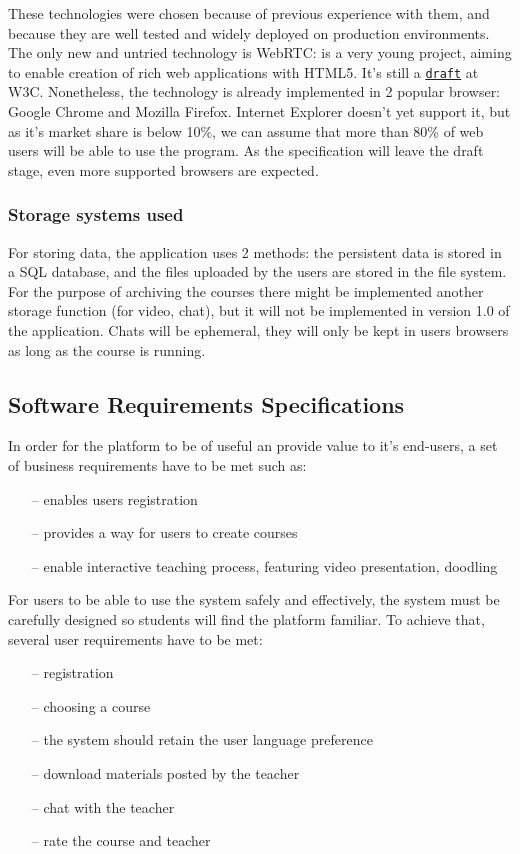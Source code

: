 These technologies were chosen because of previous experience with them, and because they
are well tested and widely deployed on production environments.
The only new and untried technology is WebRTC: is a very young project, aiming
to enable creation of rich web applications with HTML5. It's still a
\href{http://dev.w3.org/2011/webrtc/editor/webrtc.html}{\texttt{draft}} at W3C.
Nonetheless, the technology is already implemented in 2 popular browser: Google
Chrome and Mozilla Firefox.  Internet Explorer doesn't yet support it, but as
it's market share is below 10\%, we can assume that more than 80\% of web users
\citep{browserStats} will be able to use the program. As the specification will
leave the draft stage, even more supported browsers are expected.

\subsubsection{Storage systems used}
For storing data, the application uses 2 methods: the persistent data is stored
in a SQL database, and the files uploaded by the users are stored in the
file system. For the purpose of archiving the courses there might be implemented
another storage function (for video, chat), but it will not be implemented in
version 1.0 of the application. Chats will be ephemeral, they will only be kept
in users browsers as long as the course is running.

\subsection{Software Requirements Specifications}
In order for the platform to be of useful an provide value to it's end-users, a set of business
requirements have to be met such as:
\begin{enumerate}[topsep=5pt, partopsep=0pt,itemsep=3pt,parsep=1pt]
    \item[--] enables users registration
    \item[--] provides a way for users to create courses
    \item[--] enable interactive teaching process, featuring video presentation, doodling
\end{enumerate}

For users to be able to use the system safely and effectively, the system must be carefully designed
so students will find the platform familiar. To achieve that, several user requirements have
to be met:
\begin{enumerate}[topsep=5pt, partopsep=0pt,itemsep=3pt,parsep=1pt]
    \item[--] registration
    \item[--] choosing a course
    \item[--] the system should retain the user language preference
    \item[--] download materials posted by the teacher
    \item[--] chat with the teacher
    \item[--] rate the course and teacher
\end{enumerate}

